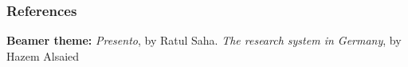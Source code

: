 \documentclass[14pt, handout]{beamer}
\begin{document}

\begin{frame}[allowframebreaks]
	\frametitle{References}
	\nocite{*}
	\scriptsize{}	
	\begin{baseitemize}
		\item \textbf{Beamer theme:} \textit{Presento}, by 
		Ratul Saha. \textit{The research system in Germany}, by Hazem Alsaied
	\end{baseitemize}
\end{frame}
\end{document}
